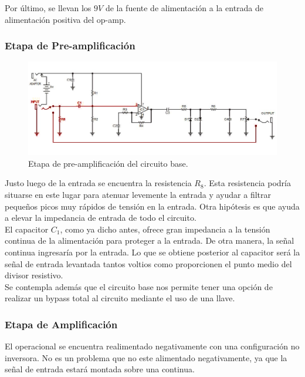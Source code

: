 Por último, se llevan los $9V$ de la fuente de alimentación a la entrada de alimentación positiva del op-amp.


\subsubsection{Etapa de Pre-amplificación}

\begin{figure}[H]
	\centering
	\includegraphics[width=1\textwidth, trim={0 0 0 0}, clip]{Ejercicio5/Imagenes/circuito_base_preamplificacion.png}
	\caption{Etapa de pre-amplificación del circuito base.}
	\label{fig:circuito_base_preamplificacion}
\end{figure}

Justo luego de la entrada se encuentra la resistencia $R_8$. Esta resistencia podría situarse en este lugar para atenuar levemente la entrada y ayudar a filtrar pequeños picos muy rápidos de tensión en la entrada. Otra hipótesis es que ayuda a elevar la impedancia de entrada de todo el circuito.\\

El capacitor $C_1$, como ya dicho antes, ofrece gran impedancia a la tensión continua de la alimentación para proteger a la entrada. De otra manera, la señal continua ingresaría por la entrada.
Lo que se obtiene posterior al capacitor será la señal de entrada levantada tantos voltios como proporcionen el punto medio del divisor resistivo.\\

Se contempla además que el circuito base nos permite tener una opción de realizar un bypass total al circuito mediante el uso de una llave.

\subsubsection{Etapa de Amplificación}

El operacional se encuentra realimentado negativamente con una configuración no inversora. No es un problema que no este alimentado negativamente, ya que la señal de entrada estará montada sobre una continua.

